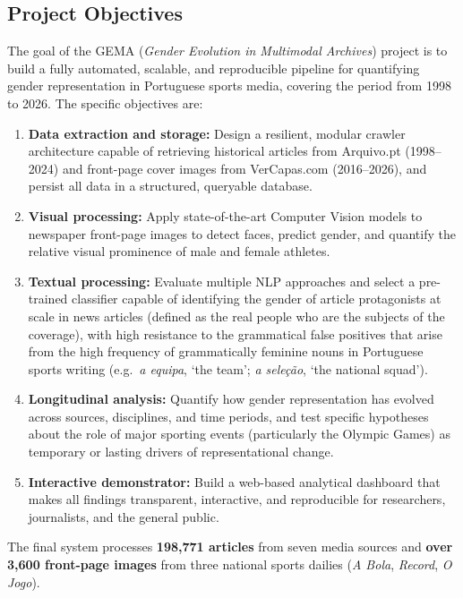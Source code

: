\documentclass[11pt,a4paper]{article}
\begin{document}
\subsection{Project Objectives}
\label{sec:objectives}

The goal of the GEMA (\textit{Gender Evolution in Multimodal Archives}) project is to build a fully automated, scalable, and reproducible pipeline for quantifying gender representation in Portuguese sports media, covering the period from 1998 to 2026. The specific objectives are:

\begin{enumerate}[leftmargin=*, itemsep=3pt]
  \item \textbf{Data extraction and storage:} Design a resilient, modular crawler architecture capable of retrieving historical articles from Arquivo.pt (1998–2024) and front-page cover images from VerCapas.com (2016–2026), and persist all data in a structured, queryable database.
  \item \textbf{Visual processing:} Apply state-of-the-art Computer Vision models to newspaper front-page images to detect faces, predict gender, and quantify the relative visual prominence of male and female athletes.
  \item \textbf{Textual processing:} Evaluate multiple NLP approaches and select a pre-trained classifier capable of identifying the gender of article protagonists at scale in news articles (defined as the real people who are the subjects of the coverage), with high resistance to the grammatical false positives that arise from the high frequency of grammatically feminine nouns in Portuguese sports writing (e.g.\ \textit{a equipa}, `the team'; \textit{a seleção}, `the national squad').
  \item \textbf{Longitudinal analysis:} Quantify how gender representation has evolved across sources, disciplines, and time periods, and test specific hypotheses about the role of major sporting events (particularly the Olympic Games) as temporary or lasting drivers of representational change.
  \item \textbf{Interactive demonstrator:} Build a web-based analytical dashboard that makes all findings transparent, interactive, and reproducible for researchers, journalists, and the general public.
\end{enumerate}

The final system processes \textbf{198{,}771 articles} from seven media sources and \textbf{over 3{,}600 front-page images} from three national sports dailies (\textit{A Bola}, \textit{Record}, \textit{O Jogo}).
\end{document}
